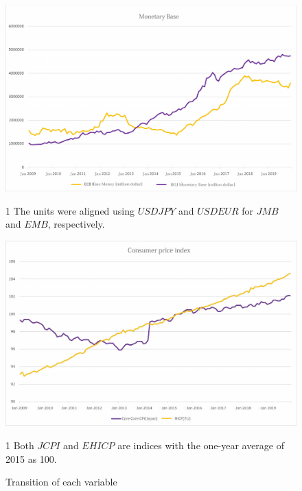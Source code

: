 \documentclass[12pt]{article}
\begin{document}
\begin{figure}[!htbp]
    \centering
    \caption{Transition of each variable}
    \vspace{10pt}
    \includegraphics[width=16cm]{mbfix.pdf}
    \vspace{10pt}
    \begin{tablenotes}\footnotesize
        \item[1] The units were aligned using $USDJPY$ and $USDEUR$ for $JMB$ and $EMB$, respectively.
    \end{tablenotes}
    \vspace{10pt}
    \includegraphics[width=16cm]{cpi09.pdf}
    \vspace{10pt}
    \begin{tablenotes}\footnotesize
        \item[1] Both $JCPI$ and $EHICP$ are indices with the one-year average of 2015 as 100.
    \end{tablenotes}
\end{figure}
\end{document}
